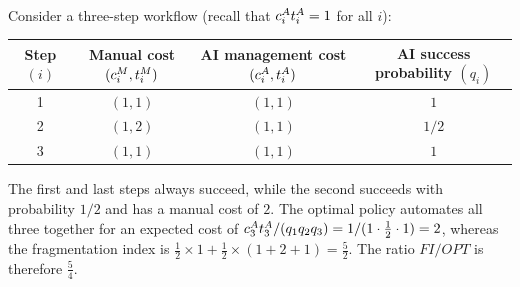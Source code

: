 \documentclass[12pt, final]{article}
\begin{document}
\\[-0.2em]
\noindent{\color{black!25}\rule{\linewidth}{0.4pt}}\par\vspace{1em}
\renewcommand\theexample{OA-\arabic{example}}
\setcounter{example}{0}
\begin{example}
\label{ex:FI.tight}
Consider a three-step workflow (recall that $c^{A}_{i}t^{A}_{i} = 1$ for all $i$):
\begin{center}
\begin{tabular}{c|ccc}
\toprule
\makecell{Step\\$(i)$} & \makecell{Manual cost\\$(c^{M}_{i}, t^{M}_{i})$} & \makecell{AI management cost\\$(c^{A}_{i}, t^{A}_{i})$} & \makecell{AI success probability\\$(q_i)$} \\
\midrule
1 & $(1, 1)$ & $(1, 1)$ & $1$ \\
2 & $(1, 2)$ & $(1, 1)$ & $1/2$ \\
3 & $(1, 1)$ & $(1, 1)$ & $1$ \\
\bottomrule
\end{tabular}
\end{center}
The first and last steps always succeed, while the second succeeds with probability $1/2$ and has a manual cost of $2$.
The optimal policy automates all three together for an expected cost of $c^{A}_{3}t^{A}_{3}/(q_1 q_2 q_3) = 1/(1 \cdot \tfrac12 \cdot 1) = 2$, whereas the fragmentation index is $\tfrac12 \times 1 + \tfrac12 \times (1+2+1) = \tfrac52$.
The ratio $FI/OPT$ is therefore $\tfrac54$.
\end{example}
\clearpage
\end{document}
